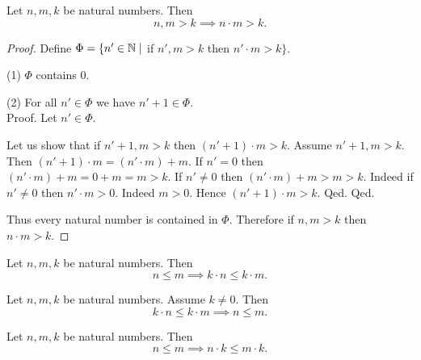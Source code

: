 \documentclass[10pt]{article}
\begin{document}
  \begin{forthel}
    \begin{proposition}
      Let $n, m, k$ be natural numbers.
      Then \[ n, m > k \implies n \cdot m > k. \]
    \end{proposition}
    \begin{proof}
      Define $\Phi = \{ n' \in \mathbb{N} \mid$ if $n', m > k$ then $n' \cdot m > k \}$.

      (1) $\Phi$ contains $0$.

      (2) For all $n' \in \Phi$ we have $n' + 1 \in \Phi$. \\
      Proof.
        Let $n' \in \Phi$.

        Let us show that if $n' + 1, m > k$ then $(n' + 1) \cdot m > k$.
          Assume $n' + 1, m > k$.
          Then $(n' + 1) \cdot m = (n' \cdot m) + m$.
          If $n' = 0$ then
          $(n' \cdot m) + m
            = 0 + m
            = m
            > k$.
          If $n' \neq 0$ then
          $(n' \cdot m) + m
            > m
            > k$.
          Indeed if $n' \neq 0$ then $n' \cdot m > 0$.
          Indeed $m > 0$.
          Hence $(n' + 1) \cdot m > k$.
        Qed.
      Qed.

      Thus every natural number is contained in $\Phi$.
      Therefore if $n, m > k$ then $n \cdot m > k$.
    \end{proof}
  \end{forthel}

  \begin{forthel}
    \begin{corollary}
      Let $n, m, k$ be natural numbers.
      Then \[ n \leq m \implies k \cdot n \leq k \cdot m. \]
    \end{corollary}
  \end{forthel}

  \begin{forthel}
    \begin{corollary}
      Let $n, m, k$ be natural numbers.
      Assume $k \neq 0$.
      Then \[ k \cdot n \leq k \cdot m \implies n \leq m. \]
    \end{corollary}
  \end{forthel}

  \begin{forthel}
    \begin{corollary}
      Let $n, m, k$ be natural numbers.
      Then \[ n \leq m \implies n \cdot k \leq m \cdot k. \]
    \end{corollary}
  \end{forthel}
\end{document}
